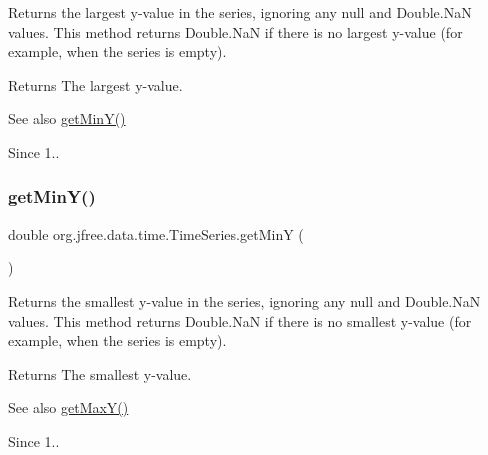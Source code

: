 Returns the largest y-\/value in the series, ignoring any {\ttfamily null} and {\ttfamily Double.\+NaN} values. This method returns {\ttfamily Double.\+NaN} if there is no largest y-\/value (for example, when the series is empty).

\begin{DoxyReturn}{Returns}
The largest y-\/value.
\end{DoxyReturn}
\begin{DoxySeeAlso}{See also}
\mbox{\hyperlink{classorg_1_1jfree_1_1data_1_1time_1_1_time_series_a5ec14c92abfbd1acd91d2004c574ce88}{get\+Min\+Y()}}
\end{DoxySeeAlso}
\begin{DoxySince}{Since}
1.. 
\end{DoxySince}
\mbox{\label{classorg_1_1jfree_1_1data_1_1time_1_1_time_series_a5ec14c92abfbd1acd91d2004c574ce88}} 
\subsubsection{\texorpdfstring{get\+Min\+Y()}{getMinY()}}
{\footnotesize\ttfamily double org.\+jfree.\+data.\+time.\+Time\+Series.\+get\+MinY (\begin{DoxyParamCaption}{ }\end{DoxyParamCaption})}

Returns the smallest y-\/value in the series, ignoring any {\ttfamily null} and {\ttfamily Double.\+NaN} values. This method returns {\ttfamily Double.\+NaN} if there is no smallest y-\/value (for example, when the series is empty).

\begin{DoxyReturn}{Returns}
The smallest y-\/value.
\end{DoxyReturn}
\begin{DoxySeeAlso}{See also}
\mbox{\hyperlink{classorg_1_1jfree_1_1data_1_1time_1_1_time_series_a7b8dddcabcd0c9e583ea043357d8f30a}{get\+Max\+Y()}}
\end{DoxySeeAlso}
\begin{DoxySince}{Since}
1.. 
\end{DoxySince}
\mbox{\label{classorg_1_1jfree_1_1data_1_1time_1_1_time_series_a1527c3a267e42abf6f0cb6a5088061c1}} 
